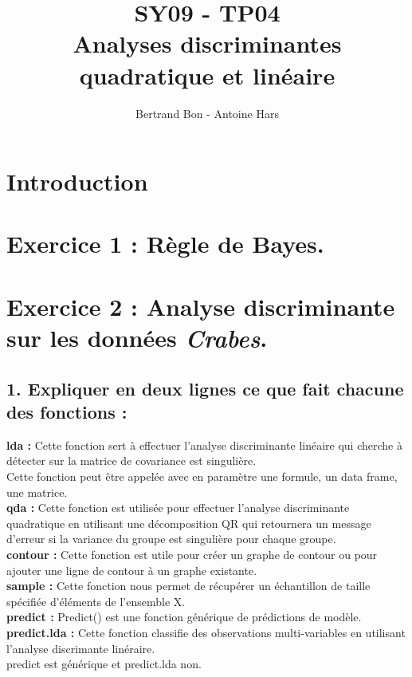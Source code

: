 \documentclass[a4paper, 10pt]{article}
\title{SY09 - TP04\\Analyses discriminantes quadratique et linéaire}
\author{Bertrand Bon - Antoine Hars}
\begin{document}
\maketitle

\section*{Introduction}


\section*{Exercice 1 : Règle de Bayes.}

\subsection*{}

\subsection*{}

\section*{Exercice 2 : Analyse discriminante sur les données \textit{Crabes}.}

\subsection*{1. Expliquer en deux lignes ce que fait chacune des fonctions :}
\textbf{lda :} Cette fonction sert à effectuer l'analyse discriminante linéaire qui cherche à détecter sur la matrice de covariance est singulière.\\
Cette fonction peut être appelée avec en paramètre une formule, un data frame, une matrice.\\
\textbf{qda :} Cette fonction est utilisée pour effectuer l'analyse discriminante quadratique en utilisant une décomposition QR qui retournera un message d'erreur si la variance du groupe est singulière pour chaque groupe.\\
\textbf{contour :} Cette fonction est utile pour créer un graphe de contour ou pour ajouter une ligne de contour à un graphe existante.\\
\textbf{sample :} Cette fonction nous permet de récupérer un échantillon de taille spécifiée d'éléments de l'ensemble X.\\
\textbf{predict :} Predict() est une fonction générique de prédictions de modèle.\\
\textbf{predict.lda :} Cette fonction classifie des observations multi-variables en utilisant l'analyse discrimante linéraire.\\
 predict est générique et predict.lda non.\\ \\
\end{document}
